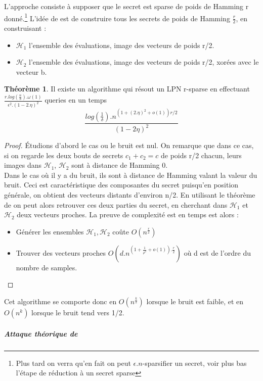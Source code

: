 \documentclass{article}		%
\theoremstyle{definition}
\newtheorem{theo}{Théorème}
\theoremstyle{plain}
\theoremstyle{plain}
\theoremstyle{plain}
\theoremstyle{plain}
\theoremstyle{plain}
\begin{document}
  L'approche consiste à supposer que le secret est sparse de poids de
  Hamming r
  donné.\footnote{Plus tard on verra qu'en fait on peut $\epsilon.n$-sparsifier un
  secret, voir plus bas l'étape de réduction à un secret sparse}
  L'idée de \cite{Grigo} est de construire tous les secrets de poids de
  Hamming $\frac{r}{2}$, en construisant :
\begin{itemize}
      \item $\mathcal{H}_1$ l'ensemble des évaluations, image des vecteurs de
      poids r/2.
      \item $\mathcal{H}_2$ l'ensemble des évaluations, image des vecteurs de
      poids r/2, xorées avec le vecteur b.
\end{itemize}  
\begin{theo} Il existe un algorithme qui résout un LPN r-sparse en
    effectuant
    $\frac{r.log(\frac{n}{\delta}).\omega(1)}{\epsilon^2.(1-2.\eta)^2}$
    queries en un temps
    $$\frac{log(\frac{1}{\delta}).n^{(1+(2.\eta)^2+o(1))r/2}}{(1-2\eta)^2}$$
\end{theo}
\begin{proof} Étudions d'abord le cas ou le bruit est nul. On
  remarque que dans ce cas, si on regarde les deux bouts de secrets $c_1+c_2=c$ de poids
  r/2 chacun, leurs images dans $\mathcal{H}_1$, $\mathcal{H}_2$ sont à
  distance de Hamming 0. \\
  Dans le cas où il y a du bruit, ils sont à
  distance de Hamming valant la valeur du bruit. Ceci est caractéristique
  des composantes du secret puisqu'en position générale, on obtient des
  vecteurs distants d'environ n/2. En utilisant le théorème de \cite{Indyk}
  on peut alors retrouver ces deux parties du secret, en cherchant dans
  $\mathcal{H}_1$ et $\mathcal{H}_2$ deux vecteurs proches. La preuve de complexité
  est en temps est alors :
\begin{itemize}
\item Générer les ensembles $\mathcal{H}_1,\mathcal{H}_2$ coûte
$O(n^\frac{r}{2})$  
\item Trouver des vecteurs proches
$O(d.n^{(1+\frac{1}{\rho^2}+o(1)).\frac{r}{2}})$ où d est de l'ordre du
nombre de samples. 
\end{itemize} 
\end{proof}
Cet algorithme se comporte donc en $O(n^{\frac{k}{2}})$ lorsque le bruit
est faible, et en $O(n^k)$ lorsque le bruit tend vers 1/2.

\subparagraph{Attaque théorique de \cite{Valiant}} 
\end{document}
